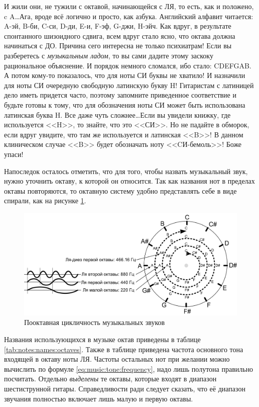 \begin{Example}
    И жили они, не тужили с октавой, начинающейся с ЛЯ, то есть, как и положено, c A\ldots Ага, вроде всё логично и просто, как азбука. Английский алфавит читается: A-эй, B-би, C-си, D-ди, E-и, F-эф, G-джи, H-эйч. Как вдруг, в результате спонтанного шизоидного сдвига, всем вдруг стало ясно, что октава должна начинаться с ДО. Причина сего интересна не только психиатрам! Если вы разберетесь с \emph{музыкальным ладом}, то вы сами дадите этому заскоку рациональное объяснение. И порядок немного сломался, ибо стало: CDEFGAB. А потом кому-то показалось, что для ноты СИ буквы не хватило! И назначили для ноты СИ очередную свободную латинскую букву H! Гитаристам с латиницей дело иметь придется часто, поэтому запомните приведенное соответствие и будьте готовы к тому, что для обозначения ноты СИ может быть использована латинская буква H. Все даже чуть сложнее\ldots Если вы увидели книжку, где используется <<H>>, то знайте, что это <<СИ>>. Но не падайте в обморок, если вдруг увидите, что там же используется и латинская <<B>>! В данном клиническом случае <<B>> будет обозначать ноту <<CИ-бемоль>>! Боже упаси!
\end{Example}

Напоследок осталось отметить, что для того, чтобы назвать музыкальный звук, нужно уточнить октаву, к которой он относится. Так как названия нот в пределах октавы повторяются, то октавную систему удобно представлять себе в виде спирали, как на рисунке \ref{fig:notes:names:octave}.

\begin{figure}[!ht]
    \centering
    \includegraphics{fig/intervals/octave-spiral} 
    \caption{Пооктавная цикличность музыкальных звуков}\label{fig:notes:names:octave}
\end{figure} 

Названия использующихся в музыке октав приведены в таблице \ref{tab:notes:names:octaves}. Также в таблице приведена частота основного тона входящей в октаву ноты ЛЯ. Частоты остальных нот при желании можно вычислить по формуле \eqref{eq:music:tone:frequency}, надо лишь полутона правильно посчитать. Отдельно \emph{выделены} те октавы, которые входят в диапазон шестиструнной гитары. Справедливости ради следует сказать, что её диапазон звучания полностью включает лишь малую и первую октавы.

